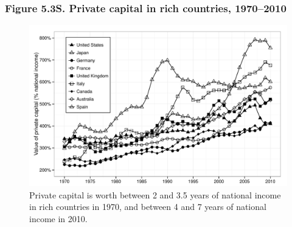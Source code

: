 \documentclass[t]{beamer}\usepackage[]{graphicx}\usepackage[]{color}
\newenvironment{knitrout}{}{} %
\begin{document}
\begin{frame}[label=Figure_5_3S]
\frametitle{Figure 5.3S. Private capital in rich countries, 1970--2010}
\begin{figure}[t]
\begin{minipage}[b]{\textwidth}
\centering
\begin{knitrout}\footnotesize
{}\color{fgcolor}

{\centering \includegraphics[width=1\linewidth]{figures/bw/Figure_5_3S} 

}



\end{knitrout}
\caption{Private capital is worth between 2 and 3.5 years of national income in rich countries in 1970, and between 4 and 7 years of national income in 2010.}
\end{minipage}
\end{figure}
\end{frame}
\end{document}
